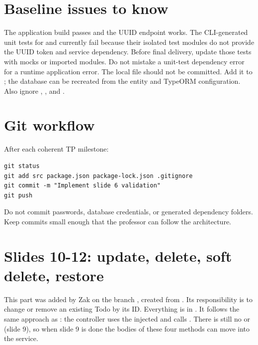 \section{Baseline issues to know}
The application build passes and the UUID endpoint works. The CLI-generated unit tests for  and  currently fail because their isolated test modules do not provide the UUID token and service dependency. Before final delivery, update those tests with mocks or imported modules. Do not mistake a unit-test dependency error for a runtime application error.
The local file  should not be committed. Add it to ; the database can be recreated from the entity and TypeORM configuration. Also ignore , , and .

\section{Git workflow}
After each coherent TP milestone:
\begin{lstlisting}[language={}]
git status
git add src package.json package-lock.json .gitignore
git commit -m "Implement slide 6 validation"
git push
\end{lstlisting}
Do not commit passwords, database credentials, or generated dependency folders. Keep commits small enough that the professor can follow the architecture.

\section{Slides 10-12: update, delete, soft delete, restore}
This part was added by Zak on the branch , created from . Its responsibility is to change or remove an existing Todo by its ID. Everything is in . It follows the same approach as : the controller uses the injected  and calls . There is still no  or  (slide 9), so when slide 9 is done the bodies of these four methods can move into the service.

